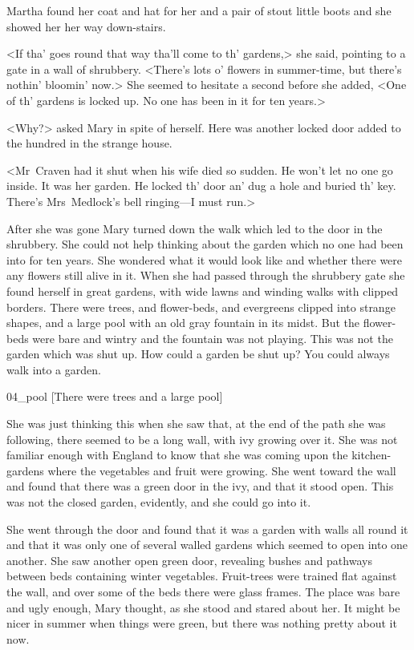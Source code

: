 Martha found her coat and hat for her and a pair of stout little boots and she showed her her way down-stairs.

<If tha' goes round that way tha'll come to th' gardens,> she said, pointing to a gate in a wall of shrubbery. <There's lots o' flowers in summer-time, but there's nothin' bloomin' now.> She seemed to hesitate a second before she added, <One of th' gardens is locked up. No one has been in it for ten years.>

<Why?> asked Mary in spite of herself. Here was another locked door added to the hundred in the strange house.

<Mr~Craven had it shut when his wife died so sudden. He won't let no one go inside. It was her garden. He locked th' door an' dug a hole and buried th' key. There's Mrs~Medlock's bell ringing—I must run.>

After she was gone Mary turned down the walk which led to the door in the shrubbery. She could not help thinking about the garden which no one had been into for ten years. She wondered what it would look like and whether there were any flowers still alive in it. When she had passed through the shrubbery gate she found herself in great gardens, with wide lawns and winding walks with clipped borders. There were trees, and flower-beds, and evergreens clipped into strange shapes, and a large pool with an old gray fountain in its midst. But the flower-beds were bare and wintry and the fountain was not playing. This was not the garden which was shut up. How could a garden be shut up? You could always walk into a garden.

\begin{colorbigpic}
	[\basicscale]
	{04_pool}
	[There were trees and a large pool]
\end{colorbigpic}

She was just thinking this when she saw that, at the end of the path she was following, there seemed to be a long wall, with ivy growing over it. She was not familiar enough with England to know that she was coming upon the kitchen-gardens where the vegetables and fruit were growing. She went toward the wall and found that there was a green door in the ivy, and that it stood open. This was not the closed garden, evidently, and she could go into it.

She went through the door and found that it was a garden with walls all round it and that it was only one of several walled gardens which seemed to open into one another. She saw another open green door, revealing bushes and pathways between beds containing winter vegetables. Fruit-trees were trained flat against the wall, and over some of the beds there were glass frames. The place was bare and ugly enough, Mary thought, as she stood and stared about her. It might be nicer in summer when things were green, but there was nothing pretty about it now.

